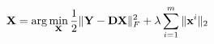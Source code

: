 \documentclass{standalone}
\begin{document}
$ \displaystyle
\mathbf{X} = \arg\min_{\mathbf{X}} \frac{1}{2}\|\mathbf{Y} - \mathbf{D}\mathbf{X}\|_F^2 + \lambda \sum_{i=1}^m \|\mathbf{x}^i\|_2
$
\end{document}
